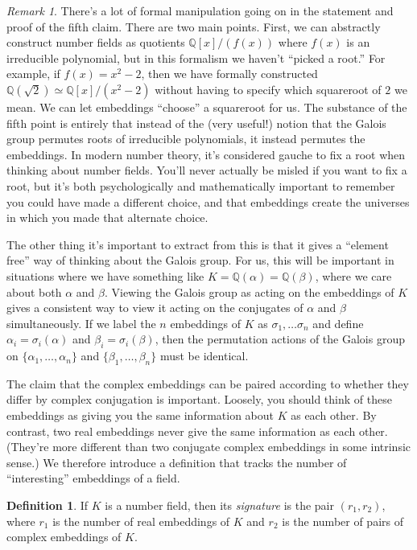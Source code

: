 \documentclass[12pt]{amsart}
\theoremstyle{definition} \newtheorem*{notation}{Notation}
\theoremstyle{remark} \newtheorem*{remark}{Remark}
\theoremstyle{remark} \newtheorem*{example}{Example}
\theoremstyle{definition} \newtheorem*{definition}{Definition}
\numberwithin{equation}{section}
\numberwithin{theorem}{section}
\begin{document}
	\begin{remark}
		There's a lot of formal manipulation going on in the statement and proof of the fifth claim.  There are two main points.  First, we can abstractly construct number fields as quotients $\mathbb{Q}[x] / (f(x))$ where $f(x)$ is an irreducible polynomial, but in this formalism we haven't ``picked a root.''  For example, if $f(x)=x^2-2$, then we have formally constructed $\mathbb{Q}(\sqrt{2}) \simeq \mathbb{Q}[x]/(x^2-2)$ without having to specify which squareroot of $2$ we mean.  We can let embeddings ``choose'' a squareroot for us.  The substance of the fifth point is entirely that instead of the (very useful!) notion that the Galois group permutes roots of irreducible polynomials, it instead permutes the embeddings.  In modern number theory, it's considered gauche to fix a root when thinking about number fields.  You'll never actually be misled if you want to fix a root, but it's both psychologically and mathematically important to remember you could have made a different choice, and that embeddings create the universes in which you made that alternate choice.  
		
		The other thing it's important to extract from this is that it gives a ``element free'' way of thinking about the Galois group.  For us, this will be important in situations where we have something like $K = \mathbb{Q}(\alpha) = \mathbb{Q}(\beta)$, where we care about both $\alpha$ and $\beta$.  Viewing the Galois group as acting on the embeddings of $K$ gives a consistent way to view it acting on the conjugates of $\alpha$ and $\beta$ simultaneously.  If we label the $n$ embeddings of $K$ as $\sigma_1,\dots\sigma_n$ and define $\alpha_i = \sigma_i(\alpha)$ and $\beta_i = \sigma_i(\beta)$, then the permutation actions of the Galois group on $\{\alpha_1,\dots,\alpha_n\}$ and $\{\beta_1,\dots,\beta_n\}$ must be identical.
	\end{remark}
	
	The claim that the complex embeddings can be paired according to whether they differ by complex conjugation is important.  Loosely, you should think of these embeddings as giving you the same information about $K$ as each other.  By contrast, two real embeddings never give the same information as each other.  (They're more different than two conjugate complex embeddings in some intrinsic sense.)  We therefore introduce a definition that tracks the number of ``interesting'' embeddings of a field.
	
	\begin{definition}
		If $K$ is a number field, then its \emph{signature} is the pair $(r_1,r_2)$, where $r_1$ is the number of real embeddings of $K$ and $r_2$ is the number of pairs of complex embeddings of $K$.
	\end{definition}
	
\end{document}
